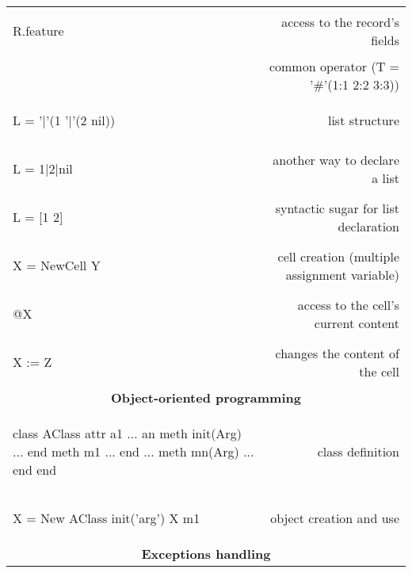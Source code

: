 \documentclass[12pt]{article}
\begin{document}
\begin{longtable}{l r}
\begin{oz}
R.feature
\end{oz}
&access to the record's fields\\

\begin{oz}
T = 1#2#3
\end{oz}
& common operator (T = '\#'(1:1 2:2 3:3))\\

\begin{oz}
L = '|'(1 '|'(2 nil))
\end{oz}
& list structure\\

\begin{oz}
L = 1|2|nil
\end{oz}
& another way to declare a list\\

\begin{oz}
L = [1 2]
\end{oz}
& syntactic sugar for list declaration\\

\begin{oz}
X = {NewCell Y}
\end{oz}
&cell creation (multiple assignment variable) \\

\begin{oz}
@X
\end{oz}
& access to the cell's current content\\

\begin{oz}
X := Z
\end{oz}
&changes the content of the cell \\[0.4em]

\multicolumn{2}{c}{\textbf{Object-oriented programming}}\\

\begin{oz}
class AClass
	attr a1 ... an
	meth init(Arg) ... end
	meth m1 ... end
		...
	meth mn(Arg) ... end
end
\end{oz}
&class definition\\

\begin{oz}
X = {New AClass init('arg')}
{X m1}
\end{oz}
&object creation and use\\[0.4em]

\multicolumn{2}{c}{\textbf{Exceptions handling}}\\


\end{longtable}
\end{document}
